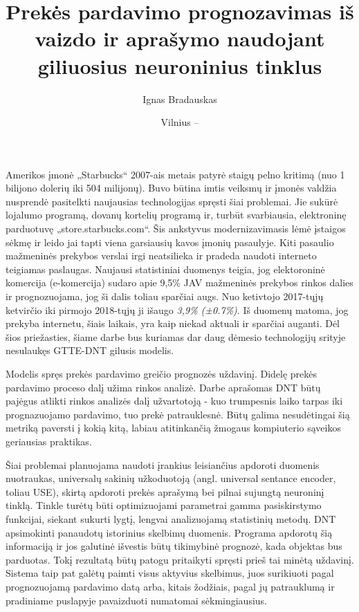 \documentclass{VUMIFPSkursinis}
\title{Prekės pardavimo prognozavimas iš vaizdo ir aprašymo naudojant giliuosius neuroninius tinklus}
\author{Ignas Bradauskas}
\date{Vilnius – \the\year}
\begin{document}
\maketitle

\tableofcontents



Amerikos įmonė „Starbucks“ 2007-ais metais patyrė staigų pelno kritimą (nuo 1 bilijono dolerių iki 504 milijonų). 
Buvo būtina imtis veiksmų ir įmonės valdžia nusprendė pasitelkti naujausias technologijas spręsti šiai problemai. Jie sukūrė lojalumo programą, dovanų kortelių programą ir, turbūt svarbiausia, elektroninę parduotuvę „store.starbucks.com“. \cite{ElCom}
Šis ankstyvus modernizavimasis lėmė įstaigos sėkmę ir leido jai tapti viena garsiausių kavos įmonių pasaulyje. Kiti
pasaulio mažmeninės prekybos verslai irgi neatsilieka ir pradeda naudoti interneto teigiamas paslaugas. Naujausi statistiniai duomenys
teigia, jog elektoroninė komercija (e-komercija) sudaro apie 9,5\% JAV mažmeninės prekybos rinkos dalies ir prognozuojama, jog ši dalis toliau sparčiai augs. Nuo ketivtojo 2017-tųjų ketvirčio iki pirmojo 2018-tųjų ji išaugo \textit{3,9\%  (±0.7\%)}.  \cite{US}  Iš duomenų matoma, jog prekyba internetu, šiais laikais, yra kaip niekad aktuali ir sparčiai auganti. Dėl šios priežasties, šiame darbe bus kuriamas dar daug dėmesio technologijų srityje nesulaukęs GTTE-DNT gilusis modelis.

Modelis spręs prekės pardavimo greičio prognozės uždavinį. Didelę prekės pardavimo proceso dalį užima rinkos analizė. Darbe aprašomas DNT būtų pajėgus atlikti rinkos analizės dalį užvartotoją - kuo trumpesnis laiko tarpas iki prognazuojamo pardavimo, tuo prekė patrauklesnė. Būtų galima nesudėtingai šią metriką paversti į kokią kitą, labiau atitinkančią žmogaus kompiuterio sąveikos geriausias praktikas.

Šiai problemai planuojama naudoti įrankius leisiančius apdoroti duomenis nuotraukas, universalų sakinių užkoduotoją (angl. universal sentance encoder, toliau USE), skirtą apdoroti prekės aprašymą bei pilnai sujungtą neuroninį tinklą. Tinkle turėtų būti optimizuojami parametrai gamma pasiskirstymo funkcijai, siekant sukurti lygtį, lengvai analizuojamą statistinių metodų. DNT apsimokinti panaudotų istorinius skelbimų duomenis. Programa apdorotų šią informaciją ir jos galutinė išvestis būtų tikimybinė prognozė, kada objektas bus parduotas. Tokį rezultatą būtų patogu pritaikyti spręsti prieš tai minėtą uždavinį. Sistema taip pat galėtų paimti visus aktyvius skelbimus, juos surikiuoti pagal prognozuojamą pardavimo datą arba, kitais žodžiais, pagal jų patrauklumą ir pradiniame puslapyje pavaizduoti numatomai sėkmingiausius.
\end{document}
